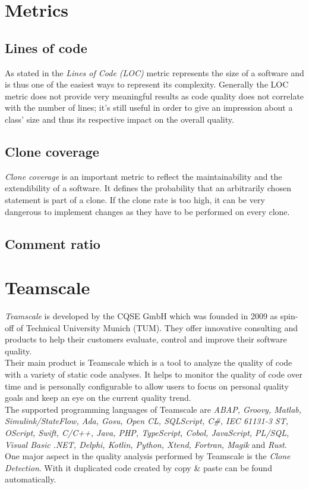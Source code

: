 \section{Metrics}
\subsection{Lines of code}
\copied
As stated in \cite{Bernwieser2014} the \textit{Lines of Code (LOC)} metric represents the size of a software and is thus one of the easiest ways to represent its complexity. Generally the LOC metric does not provide very meaningful results as code quality does not correlate with the number of lines; it’s still useful in order to give an impression about a class’ size and thus its respective impact on the overall quality.

\subsection{Clone coverage}
\copied
\textit{Clone coverage }is an important metric to reflect the maintainability
and the extendibility of a software. It defines the probability that an arbitrarily chosen statement is part of a clone. If the clone rate is too high, it can be very dangerous to implement changes as they have to be performed on every clone.

\subsection{Comment ratio}

\section{Teamscale}
\label{section:teamscale}
\textit{Teamscale} is developed by the CQSE GmbH which was founded in 2009 as spin-off of Technical University Munich (TUM). They offer innovative consulting and products to help their customers evaluate, control and improve their software quality. \\
Their main product is Teamscale which is a tool to analyze the quality of code with a variety of static code analyses. It helps to monitor the quality of code over time and is personally configurable to allow users to focus on personal quality goals and keep an eye on the current quality trend.\\
The supported programming languages of Teamscale are \textit{ABAP, Groovy, Matlab, Simulink/StateFlow, Ada, Gosu, Open CL, SQLScript, C\#, IEC 61131-3 ST, OScript, Swift, C/C++, Java, PHP, TypeScript, Cobol, JavaScript, PL/SQL, Visual Basic .NET, Delphi, Kotlin, Python, Xtend, Fortran, Magik} and \textit{Rust}.\\
One major aspect in the quality analysis performed by Teamscale is the \textit{Clone Detection}. With it duplicated code created by copy \& paste can be found automatically.

